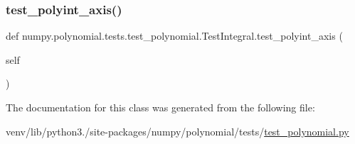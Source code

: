 \mbox{\label{classnumpy_1_1polynomial_1_1tests_1_1test__polynomial_1_1TestIntegral_abc5e39f8da6813e2db9a11188ef019d5}} 
\subsubsection{\texorpdfstring{test\+\_\+polyint\+\_\+axis()}{test\_polyint\_axis()}}
{\footnotesize\ttfamily def numpy.\+polynomial.\+tests.\+test\+\_\+polynomial.\+Test\+Integral.\+test\+\_\+polyint\+\_\+axis (\begin{DoxyParamCaption}\item[{}]{self }\end{DoxyParamCaption})}



The documentation for this class was generated from the following file\+:\begin{DoxyCompactItemize}
\item 
venv/lib/python3./site-\/packages/numpy/polynomial/tests/\hyperlink{polynomial_2tests_2test__polynomial_8py}{test\+\_\+polynomial.\+py}\end{DoxyCompactItemize}
